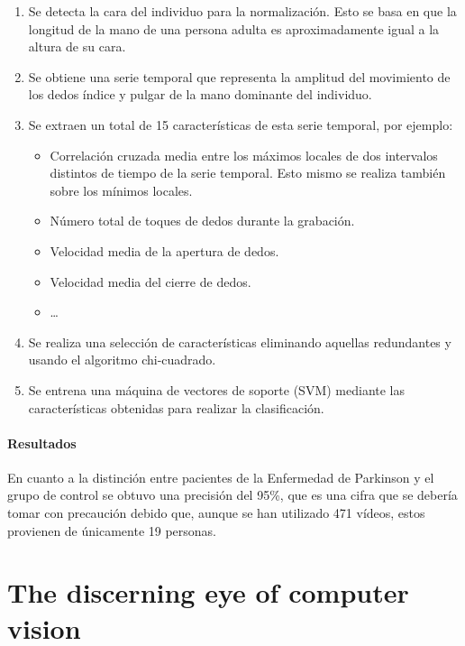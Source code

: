 \begin{enumerate}
    \item Se detecta la cara del individuo para la normalización. Esto se basa
          en que la longitud de la mano de una persona adulta es aproximadamente
          igual a la altura de su cara.
    \item Se obtiene una serie temporal que representa la amplitud del
          movimiento de los dedos índice y pulgar de la mano dominante del
          individuo.
    \item Se extraen un total de 15 características de esta serie temporal, por
          ejemplo:
          \begin{itemize}
              \item Correlación cruzada media entre los máximos locales de dos
                    intervalos distintos de tiempo de la serie temporal. Esto
                    mismo se realiza también sobre los mínimos locales.
              \item Número total de toques de dedos durante la grabación.
              \item Velocidad media de la apertura de dedos.
              \item Velocidad media del cierre de dedos.
              \item \dots
          \end{itemize}
    \item Se realiza una selección de características eliminando aquellas
          redundantes y usando el algoritmo chi-cuadrado.
    \item Se entrena una máquina de vectores de soporte (SVM) mediante las
          características obtenidas para realizar la clasificación.
\end{enumerate}


\paragraph{Resultados}

En cuanto a la distinción entre pacientes de la Enfermedad de Parkinson y el
grupo de control se obtuvo una precisión del 95\%, que es una cifra que se
debería tomar con precaución debido que, aunque se han utilizado 471 vídeos,
estos provienen de únicamente 19 personas.


\section{The discerning eye of computer vision}


